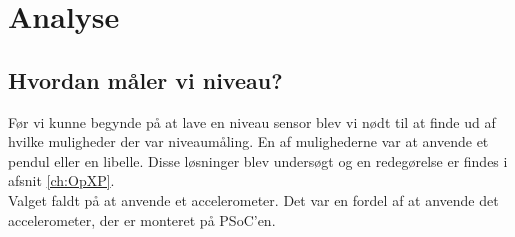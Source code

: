 \section{Analyse}
\subsection{Hvordan måler vi niveau?}
Før vi kunne begynde på at lave en niveau sensor blev vi nødt til at finde ud af hvilke muligheder der var niveaumåling. En af mulighederne var at anvende et pendul eller en libelle. Disse løsninger blev undersøgt og en redegørelse er findes i afsnit \ref{ch:OpXP}.\\
Valget faldt på at anvende et accelerometer. Det var en fordel af at anvende det accelerometer, der er monteret på PSoC'en.